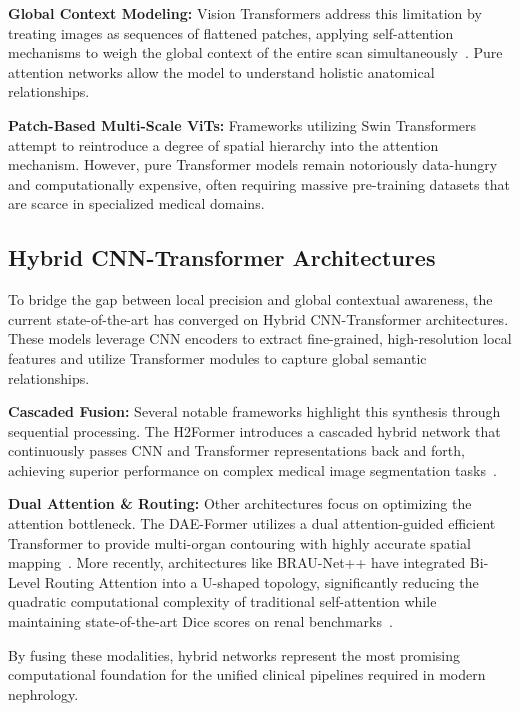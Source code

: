 \textbf{Global Context Modeling:} Vision Transformers address this limitation by treating images as sequences of flattened patches, applying self-attention mechanisms to weigh the global context of the entire scan simultaneously~\cite{islam2022vision}. Pure attention networks allow the model to understand holistic anatomical relationships.

\textbf{Patch-Based Multi-Scale ViTs:} Frameworks utilizing Swin Transformers attempt to reintroduce a degree of spatial hierarchy into the attention mechanism. However, pure Transformer models remain notoriously data-hungry and computationally expensive, often requiring massive pre-training datasets that are scarce in specialized medical domains. 

\subsection{Hybrid CNN-Transformer Architectures}
To bridge the gap between local precision and global contextual awareness, the current state-of-the-art has converged on Hybrid CNN-Transformer architectures. These models leverage CNN encoders to extract fine-grained, high-resolution local features and utilize Transformer modules to capture global semantic relationships.

\textbf{Cascaded Fusion:} Several notable frameworks highlight this synthesis through sequential processing. The H2Former introduces a cascaded hybrid network that continuously passes CNN and Transformer representations back and forth, achieving superior performance on complex medical image segmentation tasks~\cite{he2023h2former}.

\textbf{Dual Attention \& Routing:} Other architectures focus on optimizing the attention bottleneck. The DAE-Former utilizes a dual attention-guided efficient Transformer to provide multi-organ contouring with highly accurate spatial mapping~\cite{azad2023daeformer}. More recently, architectures like BRAU-Net++ have integrated Bi-Level Routing Attention into a U-shaped topology, significantly reducing the quadratic computational complexity of traditional self-attention while maintaining state-of-the-art Dice scores on renal benchmarks~\cite{lan2024braunet}.

By fusing these modalities, hybrid networks represent the most promising computational foundation for the unified clinical pipelines required in modern nephrology.